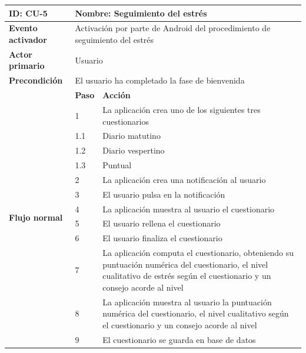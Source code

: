             \begin{table}[h]
                \centering
                \begin{tabularx}{\textwidth}{|l|l|X|}
                    \hline
                    \textbf{ID:} CU-5 & \multicolumn{2}{|X|}{\textbf{Nombre}: Seguimiento del estrés} \\
                    \hline
                    \textbf{Evento activador} & \multicolumn{2}{|X|}{Activación por parte de Android del procedimiento de seguimiento del estrés} \\
                    \hline
                    \textbf{Actor primario} & \multicolumn{2}{|X|}{Usuario} \\
                    \hline
                    \textbf{Precondición} & \multicolumn{2}{|X|}{El usuario ha completado la fase de bienvenida} \\
                    \hline
                    \multirow{13}{*}{\textbf{Flujo normal}} & \textbf{Paso} & \textbf{Acción} \\
                    \cline{2-3} & 1 & La aplicación crea uno de los siguientes tres cuestionarios \\
                    \cline{2-3} & 1.1 & Diario matutino \\
                    \cline{2-3} & 1.2 & Diario vespertino \\
                    \cline{2-3} & 1.3 & Puntual \\
                    \cline{2-3} & 2 & La aplicación crea una notificación al usuario \\
                    \cline{2-3} & 3 & El usuario pulsa en la notificación \\
                    \cline{2-3} & 4 & La aplicación muestra al usuario el cuestionario \\
                    \cline{2-3} & 5 & El usuario rellena el cuestionario \\
                    \cline{2-3} & 6 & El usuario finaliza el cuestionario \\
                    \cline{2-3} & 7 & La aplicación computa el cuestionario, obteniendo su puntuación numérica del cuestionario, el nivel cualitativo de estrés según el cuestionario y un consejo acorde al nivel \\
                    \cline{2-3} & 8 & La aplicación muestra al usuario la puntuación numérica del cuestionario, el nivel cualitativo según el cuestionario y un consejo acorde al nivel \\
                    \cline{2-3} & 9 & El cuestionario se guarda en base de datos \\

\end{tabularx}
\end{table}
